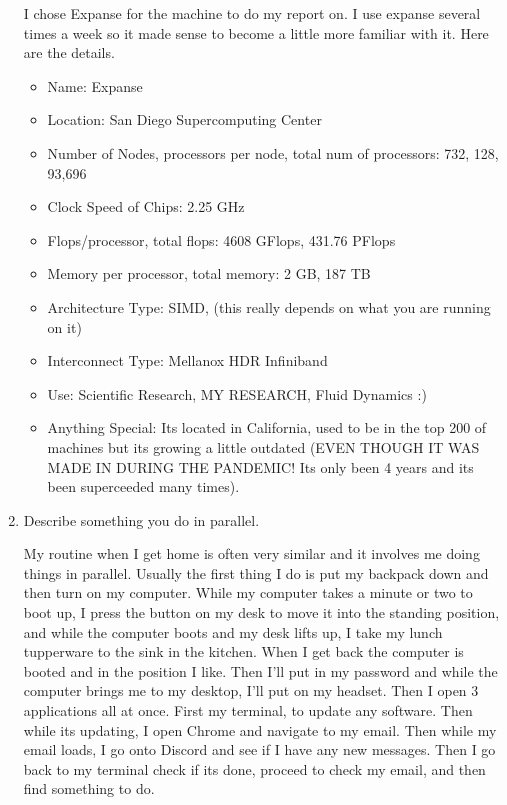 \documentclass{article}
\begin{document}
\begin{enumerate}
    I chose Expanse for the machine to do my report on. I use expanse several times a week so it made sense to become a little more familiar with it. Here are the details.
    \begin{itemize}
        \item Name: Expanse
        \item Location: San Diego Supercomputing Center
        \item Number of Nodes, processors per node, total num of processors: 732, 128, 93,696
        \item Clock Speed of Chips: 2.25 GHz
        \item Flops/processor, total flops: 4608 GFlops, 431.76 PFlops
        \item Memory per processor, total memory: 2 GB, 187 TB
        \item Architecture Type: SIMD, (this really depends on what you are running on it)
        \item Interconnect Type: Mellanox HDR Infiniband
        \item Use: Scientific Research, MY RESEARCH, Fluid Dynamics :)
        \item Anything Special: Its located in California, used to be in the top 200 of machines but its growing a little outdated (EVEN THOUGH IT WAS MADE IN DURING THE PANDEMIC! Its only been 4 years and its been superceeded many times). 
    \end{itemize}

\item Describe something you do in parallel. 

    My routine when I get home is often very similar and it involves me doing things in parallel. Usually the first thing I do is put my backpack down and then turn on my computer. While my computer takes a minute or two to boot up, I press the button on my desk to move it into the standing position, and while the computer boots and my desk lifts up, I take my lunch tupperware to the sink in the kitchen. When I get back the computer is booted and in the position I like. Then I'll put in my password and while the computer brings me to my desktop, I'll put on my headset. Then I open 3 applications all at once. First my terminal, to update any software. Then while its updating, I open Chrome and navigate to my email. Then while my email loads, I go onto Discord and see if I have any new messages. Then I go back to my terminal check if its done, proceed to check my email, and then find something to do. 
   
\end{enumerate}
\end{document}
